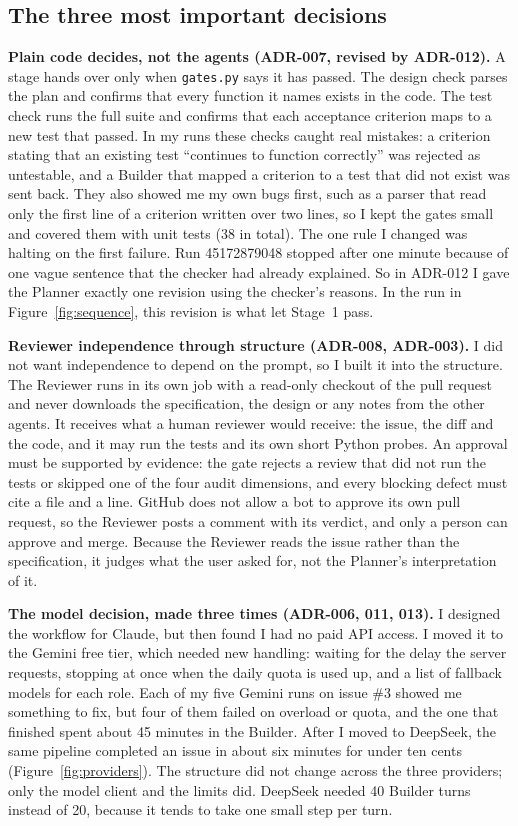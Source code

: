 \documentclass[10pt,a4paper]{article}
\newcommand{\code}[1]{\texttt{#1}}
\begin{document}
\subsection*{The three most important decisions}

\textbf{Plain code decides, not the agents (ADR-007, revised by ADR-012).} A stage hands over only when
\code{gates.py} says it has passed. The design check parses the plan and confirms that every function
it names exists in the code. The test check runs the full suite and confirms that each acceptance
criterion maps to a new test that passed. In my runs these checks caught real mistakes: a criterion stating that an
existing test ``continues to function correctly'' was rejected as untestable, and a Builder that mapped a
criterion to a test that did not exist was sent back. They also showed me my own bugs first,
such as a parser that read only the first line of a criterion written over two lines, so I kept the
gates small and covered them with unit tests (38 in total). The one rule I changed was halting on the
first failure. Run 45172879048 stopped after one minute because of one vague sentence that the
checker had already explained. So in ADR-012 I gave the Planner exactly one revision using the
checker's reasons. In the run in Figure~\ref{fig:sequence}, this revision is what let Stage~1 pass.

\textbf{Reviewer independence through structure (ADR-008, ADR-003).} I did not want independence to
depend on the prompt, so I built it into the structure. The Reviewer runs in its own job with a read-only checkout of the pull request and never
downloads the specification, the design or any notes from the other agents. It receives what a human
reviewer would receive: the issue, the diff and the code, and it may run the tests and its own short
Python probes. An approval must be supported by evidence: the gate rejects a review that did not run the
tests or skipped one of the four audit dimensions, and every blocking defect must cite a file and a line.
GitHub does not allow a bot to approve its own pull request, so the Reviewer posts a comment with its
verdict, and only a person can approve and merge. Because the Reviewer reads the issue rather than the
specification, it judges what the user asked for, not the Planner's interpretation of it.

\textbf{The model decision, made three times (ADR-006, 011, 013).} I designed the workflow for Claude,
but then found I had no paid API access. I moved it to the Gemini free tier, which needed new handling:
waiting for the delay the server requests, stopping at once when the daily quota is used up, and a list
of fallback models for each role. Each of my five Gemini runs on issue \#3 showed me something to fix,
but four of them failed on overload or quota, and the one that finished spent about 45 minutes in the
Builder. After I moved to DeepSeek, the same pipeline completed an issue in about six minutes for
under ten cents (Figure~\ref{fig:providers}). The structure did not change across the three providers;
only the model client and the limits did. DeepSeek needed 40 Builder turns instead of 20, because it
tends to take one small step per turn.
\end{document}

